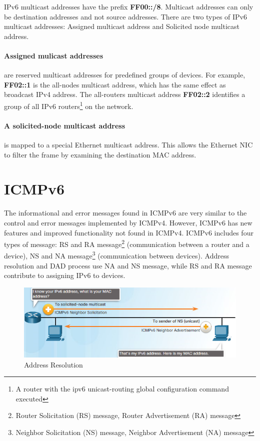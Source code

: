 IPv6 multicast addresses have the prefix \textbf{FF00::/8}. Multicast addresses can only be destination addresses and not source addresses. There are two types of IPv6 multicast addresses: Assigned multicast address and Solicited node multicast address.

\paragraph{Assigned mulicast addresses} are reserved multicast addresses for predefined groups of devices. For example, \textbf{FF02::1} is the all-nodes multicast address, which has the same effect as broadcast IPv4 address. The all-routers multicast address \textbf{FF02::2} identifies a group of all IPv6 routers\footnote{A router with the ipv6 unicast-routing global configuration command executed} on the network.

\paragraph{A solicited-node multicast address} is mapped to a special Ethernet multicast address. This allows the Ethernet NIC to filter the frame by examining the destination MAC address.

\section{ICMPv6}

The informational and error messages found in ICMPv6 are very similar to the control and error messages implemented by ICMPv4. However, ICMPv6 has new features and improved functionality not found in ICMPv4. ICMPv6 includes four types of message: RS and RA message\footnote{Router Solicitation (RS) message, Router Advertisement (RA) message} (communication between a router and a device), NS and NA message\footnote{Neighbor Solicitation (NS) message, Neighbor Advertisement (NA) message} (communication between devices). Address resolution and DAD process use NA and NS message, while RS and RA message contribute to assigning IPv6 to devices.\\

\begin{figure}[hbtp]
\caption{Address Resolution}\label{AddressResolution}
\centering
\includegraphics[scale=1]{pictures/AddressResolution.PNG}
\end{figure}


